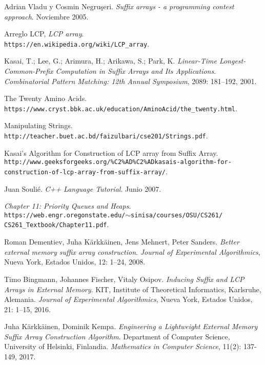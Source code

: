 \documentclass[letterpaper, 10pt, notitlepage]{report}
\begin{document}
\begin{thebibliography}{9}
Adrian Vladu y Cosmin Negru\c{s}eri.
\textit{Suffix arrays - a programming contest approach}. Noviembre 2005.

Arreglo LCP, \textit{LCP array}.
\\\texttt{https://en.wikipedia.org/wiki/LCP\_array}.

Kasai, T.; Lee, G.; Arimura, H.; Arikawa, S.; Park, K.
\textit{Linear-Time Longest-Common-Prefix Computation in Suffix Arrays and Its Applications}.
\textit{Combinatorial Pattern Matching: 12th Annual Symposium}, 2089: 181–192, 2001. 

The Twenty Amino Acids.
\\\texttt{https://www.cryst.bbk.ac.uk/education/AminoAcid/the\_twenty.html}.

Manipulating Strings.
\\\texttt{http://teacher.buet.ac.bd/faizulbari/cse201/Strings.pdf}.

Kasai’s Algorithm for Construction of LCP array from Suffix Array.
\\\texttt{http://www.geeksforgeeks.org/\%C2\%AD\%C2\%ADkasais-algorithm-for-}
\\\texttt{construction-of-lcp-array-from-suffix-array/}.

Juan Soulié.
\textit{C++ Language Tutorial}. Junio 2007.

\textit{Chapter 11: Priority Queues and Heaps}.
\\\texttt{https://web.engr.oregonstate.edu/$\sim$sinisa/courses/OSU/CS261/}
\\\texttt{CS261\_Textbook/Chapter11.pdf}. 

Roman Dementiev, Juha Kärkkäinen, Jens Mehnert, Peter Sanders.
\textit{Better external memory suffix array construction}.
\textit{Journal of Experimental Algorithmics}, Nueva York, Estados Unidos, 12: 1–24, 2008.

Timo Bingmann, Johannes Fischer, Vitaly Osipov.
\textit{Inducing Suffix and LCP Arrays in External Memory}.
KIT, Institute of Theoretical Informatics, Karlsruhe, Alemania.
\textit{Journal of Experimental Algorithmics}, Nueva York, Estados Unidos, 21: 1–15, 2016.

Juha Kärkkäinen, Dominik Kempa.
\textit{Engineering a Lightweight External Memory Suffix Array Construction Algorithm}.
Department of Computer Science, University of Helsinki, Finlandia.
\textit{Mathematics in Computer Science}, 11(2): 137-149, 2017.


\end{thebibliography}
\end{document}
